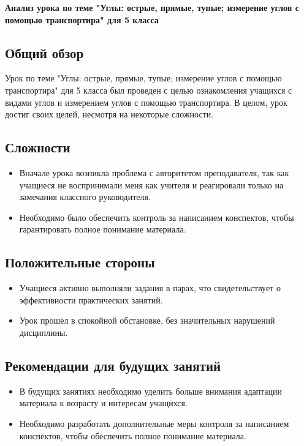 \documentclass[a4paper,12pt]{article}
\begin{document}
\begin{center}
    \large{\textbf{Анализ урока по теме "Углы: острые, прямые, тупые; измерение углов с помощью транспортира" для 5 класса}}
\end{center}

\subsection*{Общий обзор}

Урок по теме "Углы: острые, прямые, тупые; измерение углов с помощью транспортира" для 5 класса был проведен с целью ознакомления учащихся с видами углов и измерением углов с помощью транспортира. В целом, урок достиг своих целей, несмотря на некоторые сложности.

\subsection*{Сложности}

\begin{itemize}
    \item Вначале урока возникла проблема с авторитетом преподавателя, так как учащиеся не воспринимали меня как учителя и реагировали только на замечания классного руководителя.
    \item Необходимо было обеспечить контроль за написанием конспектов, чтобы гарантировать полное понимание материала.
\end{itemize}

\subsection*{Положительные стороны}

\begin{itemize}
    \item Учащиеся активно выполняли задания в парах, что свидетельствует о эффективности практических занятий.
    \item Урок прошел в спокойной обстановке, без значительных нарушений дисциплины.
\end{itemize}

\subsection*{Рекомендации для будущих занятий}

\begin{itemize}
    \item В будущих занятиях необходимо уделить больше внимания адаптации материала к возрасту и интересам учащихся.
    \item Необходимо разработать дополнительные меры контроля за написанием конспектов, чтобы обеспечить полное понимание материала.
\end{itemize}
\end{document}
